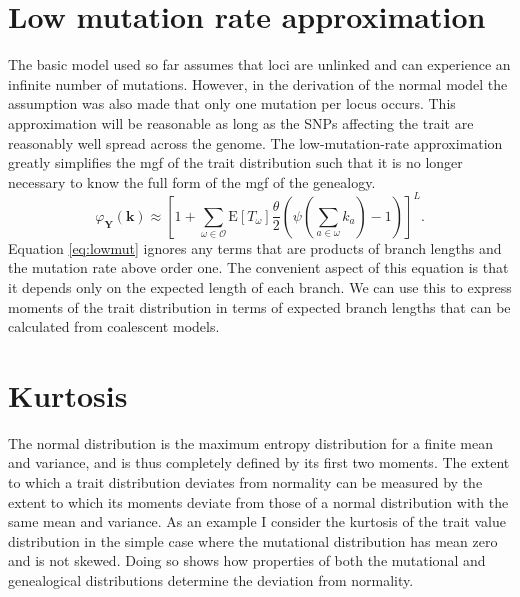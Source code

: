 \documentclass{article}
\newcommand{\T}{\frac{\theta}{2}}
\newcommand{\E}{\mathrm{E}}
\begin{document}
\section{Low mutation rate approximation}
The basic model used so far assumes that loci are unlinked and can experience an
infinite number of mutations. However, in the derivation of the normal model the
assumption was also made that only one mutation per locus occurs. This
approximation will be reasonable as long as the SNPs affecting the trait are
reasonably well spread across the genome. The low-mutation-rate approximation
greatly simplifies the mgf of the trait distribution such that it is no longer
necessary to know the full form of the mgf of the genealogy. 
\begin{equation}
\label{eq:lowmut}
\varphi_{\mathbf{Y}}(\mathbf{k}) \approx \left[ 1 + \sum_{\omega \in \mathcal{O}}
  \E[T_\omega] \T \left( \psi\left( \sum_{a \in \omega} k_a\right) -1 \right) \right]^L.
\end{equation}
Equation \eqref{eq:lowmut} ignores any terms that are products of branch lengths
and the mutation rate above order one. The convenient aspect of this equation is
that it depends only on the expected length of each branch. We can use this to
express moments of the trait distribution in terms of expected branch lengths
that can be calculated from coalescent models.
\section{Kurtosis}
The normal distribution is the maximum entropy distribution for a finite mean
and variance, and is thus completely defined by its first two moments. The
extent to which a trait distribution deviates from normality can be measured by
the extent to which its moments deviate from those of a normal distribution with
the same mean and variance. As an example I consider the kurtosis of the trait
value distribution in the simple case where the mutational distribution has mean
zero and is not skewed. Doing so shows how properties of both the mutational and
genealogical distributions determine the deviation from normality. 
\end{document}
